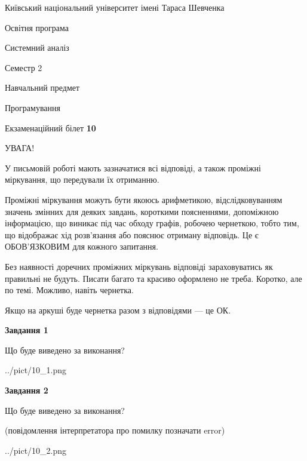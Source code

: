 \documentclass[12pt, ukrainian]{article}
\begin{document}
{{\begin {small}\par
{ \center  Київський національний університет імені Тараса Шевченка \par}
{\parbox {5 cm}{Освітня програма \hfill}{\parbox {7 cm}{Системний аналіз \hfill}}\parbox {6 cm}{\hfill Семестр 2}}\par
{\parbox {5 cm} {Навчальний предмет \hfill}\parbox {7 cm}{Програмування \hfill}\parbox {6cm}{\hfill}\par}\vspace{-7pt} \end{small}}{\center Екзаменаційний білет \No \textbf
{ 10 }\par}}
{
\begin {large}
УВАГА!

У письмовій роботі мають зазначатися всі відповіді, а також проміжні міркування, що передували їх отриманню.

Проміжні міркування можуть бути якоюсь арифметикою, відслідковуванням зна\-чень змінних для деяких завдань,
короткими поясненнями, допоміжною інформацією, що виникає під час обходу графів, робочею чернеткою,
тобто тим, що відображає хід розв’язання або пояснює отриману відповідь.
Це є ОБОВ’ЯЗКОВИМ для кожного запитання.

Без наявності доречних проміжних міркувань відповіді зараховуватись як правиль\-ні не будуть.
Писати багато та красиво оформлено не треба. Коротко, але по темі. Можли\-во, навіть чернетка.

Якщо на аркуші буде чернетка разом з відповідями --- це ОК.

\newpage

{\begin {center}\textbf{Завдання 1}\end {center}}\par
Що буде виведено за виконання?\par
\begin{center}
	{../pict/10_1.png}
\end{center}
\newpage

{\begin {center}\textbf{Завдання 2}\end {center}}\par
Що буде виведено за виконання?\par
 (повідомлення інтерпретатора про помилку позначати error)\par
\begin{center}
	{../pict/10_2.png}
\end{center}
\newpage


\end{large}}
\end{document}
